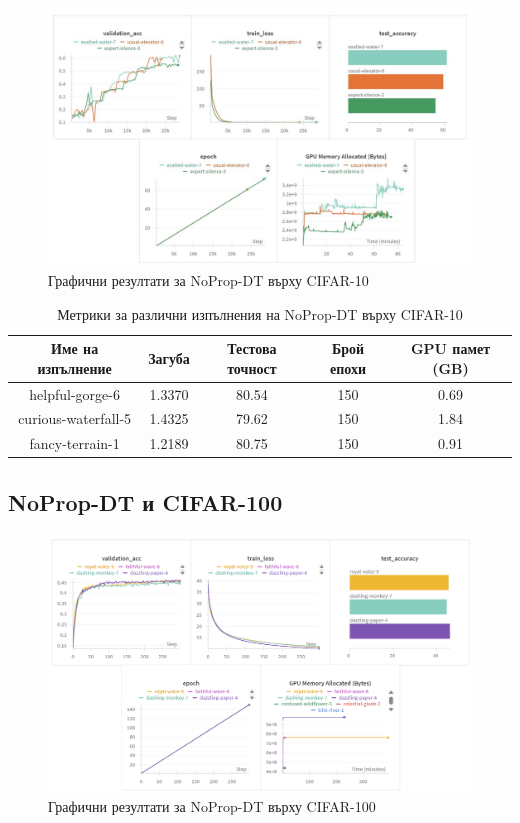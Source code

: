 \documentclass[a4paper,11pt]{article}
\begin{document}
\begin{figure}[H]
    \centering
    \includegraphics[width=6.26in,keepaspectratio]{images/NoProp-DT CIFAR10.jpg}
    \caption{Графични резултати за NoProp-DT върху CIFAR-10}
\end{figure}

\begin{table}[H]
  \centering
  \renewcommand{\arraystretch}{1.5} %
  \begin{tabular}{ccccc}
    \toprule
    \textbf{Име на изпълнение} & \textbf{Загуба} & \textbf{Тестова точност} & \textbf{Брой епохи} & \textbf{GPU памет (GB)}\\
    \midrule
    helpful-gorge-6 & 1.3370 & 80.54 & 150 & 0.69\\
    curious-waterfall-5 & 1.4325 & 79.62 & 150 & 1.84\\
    fancy-terrain-1 & 1.2189 & 80.75 & 150 & 0.91\\
    \bottomrule
  \end{tabular}
  \caption{Метрики за различни изпълнения на NoProp-DT върху CIFAR-10}
  \label{tab:avg_metrics_noprop_dt_cifar-10}
\end{table}

\subsection{NoProp-DT и CIFAR-100}

\begin{figure}[H]
    \centering
    \includegraphics[width=6.26in,keepaspectratio]{images/NoProp-DT CIFAR-100.png}
    \caption{Графични резултати за NoProp-DT върху CIFAR-100}
\end{figure}
\end{document}
